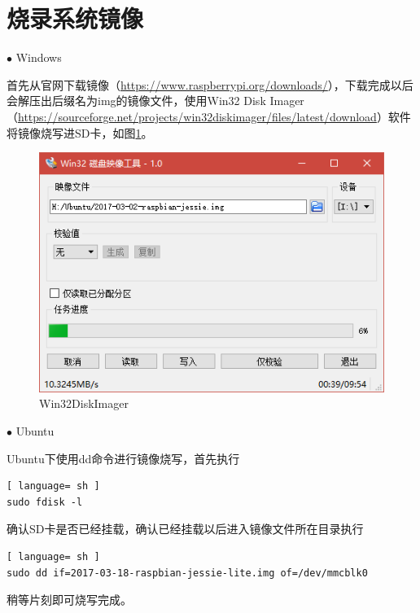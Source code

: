 	\section{烧录系统镜像}
		\par $\bullet$ Windows
		\par 首先从官网下载镜像（\href{https://www.raspberrypi.org/downloads/}{https://www.raspberrypi.org/downloads/}），下载完成以后会解压出后缀名为img的镜像文件，使用Win32 Disk Imager（\href{https://sourceforge.net/projects/win32diskimager/files/latest/download}{https://sourceforge.net/projects/win32diskimager/files/latest/download}）软件将镜像烧写进SD卡，如图\ref{fig:win32diskimager}。
		\begin{figure}[htp]
			\centering
			\includegraphics[width=13cm]{figures/win32diskimager.png}
			\caption{Win32DiskImager}
			\label{fig:win32diskimager}
		\end{figure}
		\par $\bullet$ Ubuntu
		\par Ubuntu下使用dd命令进行镜像烧写，首先执行
		\begin{lstlisting}[ language= sh ]
sudo fdisk -l
		\end{lstlisting}
		\par 确认SD卡是否已经挂载，确认已经挂载以后进入镜像文件所在目录执行
		\begin{lstlisting}[ language= sh ]
sudo dd if=2017-03-18-raspbian-jessie-lite.img of=/dev/mmcblk0
		\end{lstlisting}
		\par 稍等片刻即可烧写完成。
